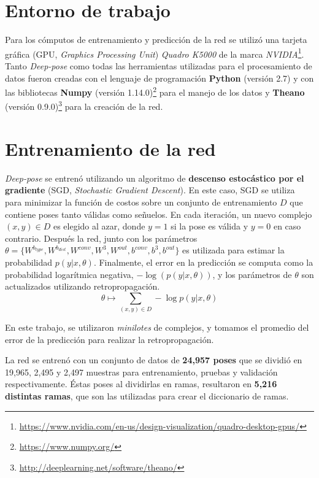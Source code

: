 \section{Entorno de trabajo}
Para los cómputos de entrenamiento y predicción de la red se utilizó
una tarjeta gráfica (GPU, \textit{Graphics Processing
Unit}) \textit{Quadro K5000} de la marca
\textit{NVIDIA}\footnote{\url{https://www.nvidia.com/en-us/design-visualization/quadro-desktop-gpus/}}.
Tanto \textit{Deep-pose} como todas las herramientas utilizadas
para el procesamiento de datos fueron creadas con el lenguaje de
programación \textbf{Python} (versión 2.7) y con las bibliotecas
\textbf{Numpy} (versión 1.14.0)\footnote{\url{https://www.numpy.org/}}
para el manejo de los datos y \textbf{Theano} (versión
0.9.0)\footnote{\url{http://deeplearning.net/software/theano/}} para la creación
de la red.

\section{Entrenamiento de la red}
\textit{Deep-pose} se entrenó utilizando un algoritmo de
\textbf{descenso estocástico por el gradiente}
(SGD, \textit{Stochastic Gradient Descent}).
En este caso, SGD se utiliza para minimizar la función de costos sobre
un conjunto de entrenamiento $D$ que contiene poses tanto válidas como
señuelos. En cada iteración, un nuevo complejo $(x,y) \in D$ es
elegido al azar, donde $y=1$ si la pose es válida y $y=0$ en caso
contrario. Después la red, junto con los parámetros $\theta
= \{W^{b_{type}}, W^{b_{dist}}, W^{conv}, W^3, W^{out}, b^{conv},
b^{3}, b^{out}\}$ es utilizada para estimar la probabilidad
$p(y|x, \theta)$. Finalmente, el error en la predicción se computa
como la probabilidad logarítmica negativa, $-\log(p(y|x, \theta))$, y
los parámetros de $\theta$ son actualizados
utilizando retropropagación.
\begin{equation}
  \theta \longmapsto \sum_{(x,y) \in D} -\log p(y|x, \theta)
\end{equation}

En este trabajo, se utilizaron \textit{minilotes} de complejos, y
tomamos el promedio del error de la predicción para realizar la
retropropagación.

La red se entrenó con un conjunto de datos de \textbf{24,957 poses}
que se dividió en 19,965, 2,495 y 2,497 muestras para entrenamiento,
pruebas y validación respectivamente. Éstas poses al dividirlas
en ramas, resultaron en \textbf{5,216 distintas ramas}, que son las
utilizadas para crear el diccionario de ramas.

